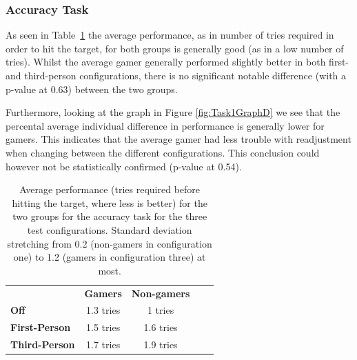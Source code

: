 \documentclass[runningheads,a4paper,oribibl]{llncs}
\begin{document}
\subsubsection{Accuracy Task}
As seen in Table~\ref{tab:Task1GraphP} the average performance, as in number of tries required in order to hit the target, for both groups is generally good (as in a low number of tries). Whilst the average gamer generally performed slightly better in both first- and third-person configurations, there is no significant notable difference (with a p-value at 0.63) between the two groups.

Furthermore, looking at the graph in Figure \ref{fig:Task1GraphD} we see that the percental average individual difference in performance is generally lower for gamers. This indicates that the average gamer had less trouble with readjustment when changing between the different configurations. This conclusion could however not be statistically confirmed (p-value at 0.54).


\begin{table}[]
\centering

\setlength{\tabcolsep}{1em}
\def\arraystretch{1.8}
\begin{tabular}{l|c|cll}
                      & {\textbf{Gamers}} & {\textbf{Non-gamers}} &  &  \\ \cline{1-3}
\textbf{Off}          & 1.3 tries                                   & 1 tries                                          &  &  \\ \cline{1-3}
\textbf{First-Person} & 1.5 tries                                    & 1.6 tries                                        &  &  \\ \cline{1-3}
\textbf{Third-Person} & 1.7 tries                                    & 1.9 tries                                        &  & 
\end{tabular}
\caption{Average performance (tries required before hitting the target, where less is better) for the two groups for the accuracy task for the three test configurations. Standard deviation stretching from 0.2 (non-gamers in configuration one) to 1.2 (gamers in configuration three) at most.}
\label{tab:Task1GraphP}
\end{table}




\end{document}
